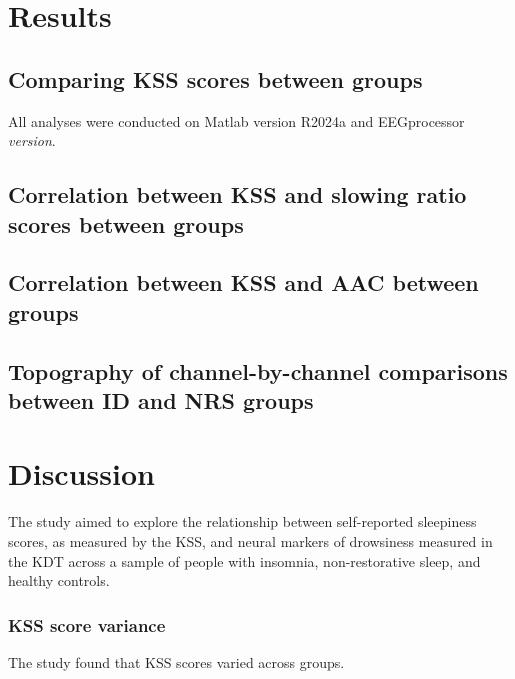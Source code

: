 \documentclass[12pt,a4paper,]{report}
\begin{document}
\newpage

\chapter{Results}\label{sec:results}

\section{Comparing KSS scores between
groups}\label{comparing-kss-scores-between-groups}

All analyses were conducted on Matlab version R2024a and EEGprocessor
\emph{version}.

\section{Correlation between KSS and slowing ratio scores between
groups}\label{correlation-between-kss-and-slowing-ratio-scores-between-groups}

\section{Correlation between KSS and AAC between
groups}\label{correlation-between-kss-and-aac-between-groups}

\section{Topography of channel-by-channel comparisons between ID and NRS
groups}\label{topography-of-channel-by-channel-comparisons-between-id-and-nrs-groups}

\newpage

\chapter{Discussion}\label{sec:discussion}

The study aimed to explore the relationship between self-reported
sleepiness scores, as measured by the KSS, and neural markers of
drowsiness measured in the KDT across a sample of people with insomnia,
non-restorative sleep, and healthy controls.

\subsection{KSS score variance}\label{kss-score-variance}

The study found that KSS scores varied across groups.
\end{document}
